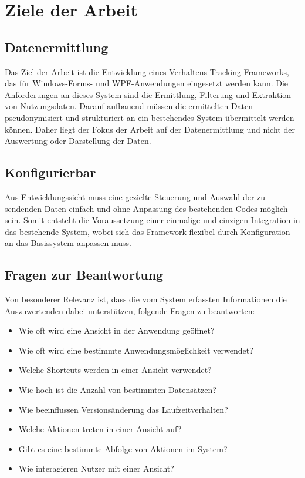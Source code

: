 \section{Ziele der Arbeit}

\subsection{Datenermittlung}
Das Ziel der Arbeit ist die Entwicklung eines Verhaltens-Tracking-Frameworks, das für Windows-Forms- und WPF-Anwendungen eingesetzt werden kann. Die Anforderungen an dieses System sind die Ermittlung, Filterung und Extraktion von Nutzungsdaten. Darauf aufbauend müssen die ermittelten Daten pseudonymisiert und strukturiert an ein bestehendes System übermittelt werden können. Daher liegt der Fokus der Arbeit auf der Datenermittlung und nicht der Auswertung oder Darstellung der Daten.

\subsection{Konfigurierbar}
Aus Entwicklungssicht muss eine gezielte Steuerung und Auswahl der zu sendenden Daten einfach und ohne Anpassung des bestehenden Codes möglich sein. Somit entsteht die Voraussetzung einer einmalige und einzigen Integration in das bestehende System, wobei sich das Framework flexibel durch Konfiguration an das Basissystem anpassen muss.

\subsection{Fragen zur Beantwortung}
\label{subsec:initial_questions}
Von besonderer Relevanz ist, dass die vom System erfassten Informationen die Auszuwertenden dabei unterstützen, folgende Fragen zu beantworten:

\begin{itemize}
    \item Wie oft wird eine Ansicht in der Anwendung geöffnet?
    \item Wie oft wird eine bestimmte Anwendungsmöglichkeit verwendet?
    \item Welche Shortcuts werden in einer Ansicht verwendet?
    \item Wie hoch ist die Anzahl von bestimmten Datensätzen?
    \item Wie beeinflussen Versionsänderung das Laufzeitverhalten?
    \item Welche Aktionen treten in einer Ansicht auf?
    \item Gibt es eine bestimmte Abfolge von Aktionen im System?
    \item Wie interagieren Nutzer mit einer Ansicht?
\end{itemize}

